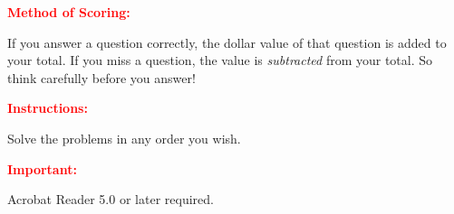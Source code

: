 \documentclass{jj_game} %
\begin{document}
\begin{instructions}

\vspace*{12pt}

\textcolor{red}{\bfseries Method of Scoring:}

If you answer a question correctly, the dollar value of that
question is added to your total.  If you miss a question, the value
is {\it subtracted\/} from your total.  So think carefully before
you answer!

\textcolor{red}{\textbf{Instructions:}}

Solve the problems in
any order you wish.

\textcolor{red}{\textbf{Important:}}

Acrobat Reader 5.0 or later required.

\begin{center}
\end{center}

\end{instructions}

\end{document}

